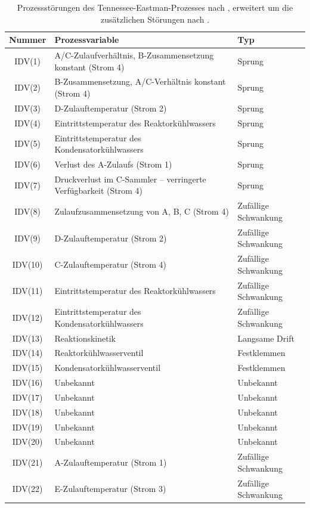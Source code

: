 \begin{table}[htbp]
\centering
\footnotesize
\caption{Prozessstörungen des Tennessee-Eastman-Prozesses nach \cite{downs.1993}, erweitert um die zusätzlichen Störungen nach \cite{bathelt.2015}.}
\label{tab:tep-stoerungen}
\begin{tabular}{cll}
\toprule
Nummer & Prozessvariable & Typ \\
\midrule
IDV(1)  & A/C-Zulaufverhältnis, B-Zusammensetzung konstant (Strom 4) & Sprung \\
IDV(2)  & B-Zusammensetzung, A/C-Verhältnis konstant (Strom 4) & Sprung \\
IDV(3)  & D-Zulauftemperatur (Strom 2) & Sprung \\
IDV(4)  & Eintrittstemperatur des Reaktorkühlwassers & Sprung \\
IDV(5)  & Eintrittstemperatur des Kondensatorkühlwassers & Sprung \\
IDV(6)  & Verlust des A-Zulaufs (Strom 1) & Sprung \\
IDV(7)  & Druckverlust im C-Sammler -- verringerte Verfügbarkeit (Strom 4) & Sprung \\
IDV(8)  & Zulaufzusammensetzung von A, B, C (Strom 4) & Zufällige Schwankung \\
IDV(9)  & D-Zulauftemperatur (Strom 2) & Zufällige Schwankung \\
IDV(10) & C-Zulauftemperatur (Strom 4) & Zufällige Schwankung \\
IDV(11) & Eintrittstemperatur des Reaktorkühlwassers & Zufällige Schwankung \\
IDV(12) & Eintrittstemperatur des Kondensatorkühlwassers & Zufällige Schwankung \\
IDV(13) & Reaktionskinetik & Langsame Drift \\
IDV(14) & Reaktorkühlwasserventil & Festklemmen \\
IDV(15) & Kondensatorkühlwasserventil & Festklemmen \\
IDV(16) & Unbekannt & Unbekannt \\
IDV(17) & Unbekannt & Unbekannt \\
IDV(18) & Unbekannt & Unbekannt \\
IDV(19) & Unbekannt & Unbekannt \\
IDV(20) & Unbekannt & Unbekannt \\
\midrule
IDV(21) & A-Zulauftemperatur (Strom 1) & Zufällige Schwankung \\
IDV(22) & E-Zulauftemperatur (Strom 3) & Zufällige Schwankung \\

\end{tabular}
\end{table}
